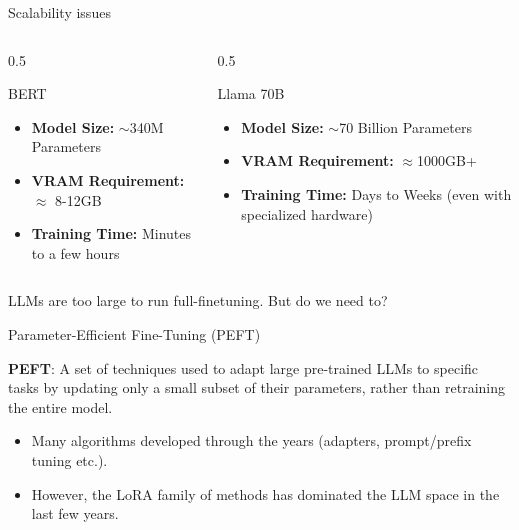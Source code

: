 \documentclass[24pt]{beamer}
\begin{document}
\begin{frame}{Scalability issues}
    \begin{columns}
        \begin{column}{0.5\textwidth}
            \begin{block}{BERT}
                \centering
                \begin{itemize}
                    \item \textbf{Model Size:} $\sim$340M Parameters \item
                    \textbf{VRAM Requirement:} $\approx$ 8-12GB \item
                    \textbf{Training Time:} Minutes to a few hours
                \end{itemize}
            \end{block}
        \end{column}

        \begin{column}{0.5\textwidth}
            \begin{block}{Llama 70B}
                \centering
                \begin{itemize}
                    \item \textbf{Model Size:} $\sim$70 Billion Parameters
                    \item \textbf{VRAM Requirement:} $\approx$1000GB+ \item
                    \textbf{Training Time:} Days to Weeks (even with
                    specialized hardware)
                \end{itemize}
            \end{block}
        \end{column}
    \end{columns}

    \begin{center}
        LLMs are \alert{too large} to run full-finetuning. But do we need
        to?
    \end{center}
\end{frame}

\begin{frame}{Parameter-Efficient Fine-Tuning (PEFT)}
   	\begin{definition}
   		\textbf{PEFT}:  A set of techniques used to adapt large pre-trained LLMs to specific tasks by updating only a \alert{small subset of their parameters}, rather than retraining the entire model.
   	\end{definition}
   	\vspace{2em}
   	\begin{itemize}
   		\item Many algorithms developed through the years (adapters, prompt/prefix tuning etc.).
   		\item However, the \alert{LoRA}  family of methods has dominated the LLM space in the last few years.
   	\end{itemize}
\end{frame}
\end{document}
